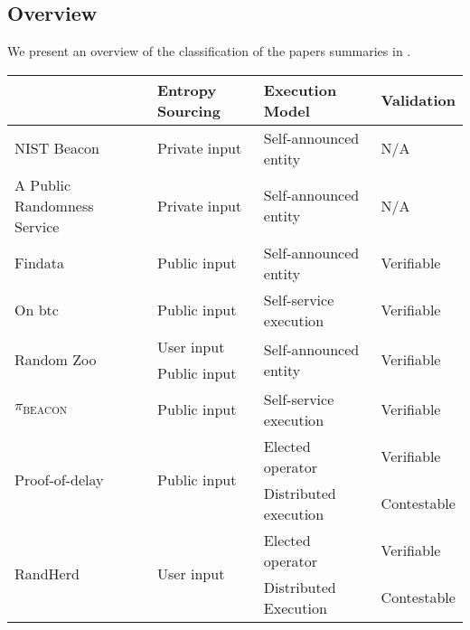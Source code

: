 \subsection{Overview}\label{sub:overview}
We present an overview of the classification of the papers summaries in .

\begin{table}[htbp]
    \centering
    \begin{tabularx}{\textwidth}{Xlll}
                                 & \textbf{Entropy Sourcing}     & \textbf{Execution Model}               & \textbf{Validation}         \\\midrule
NIST Beacon                      & Private input                 & Self-announced entity                  & N/A                         \\ [1.5em]
A Public Randomness Service      & Private input                 & Self-announced entity                  & N/A                         \\ [1.5em]
Findata                          & Public  input                 & Self-announced entity                  & Verifiable                  \\ [1.5em]
On btc                           & Public input                  & Self-service execution                 & Verifiable                  \\ [1.5em]
\multirow{2}{*}{Random Zoo}      & User input                    & \multirow{2}{*}{Self-announced entity} & \multirow{2}{*}{Verifiable} \\
                                 & Public input                  &                                        & \\ [1.5em]
$\pi_\text{BEACON}$              & Public input                  & Self-service execution                 & Verifiable                  \\ [1.5em]
\multirow{2}{*}{Proof-of-delay}  & \multirow{2}{*}{Public input} & Elected operator                       & Verifiable                  \\
                                 &                               & Distributed execution                  & Contestable                 \\ [1.5em]
\multirow{2}{*}{RandHerd}        & \multirow{2}{*}{User input}   & Elected operator                       & Verifiable                  \\
                                 &                               & Distributed Execution                  & Contestable                 \\ [1.5em]

\end{tabularx}
\end{table}
